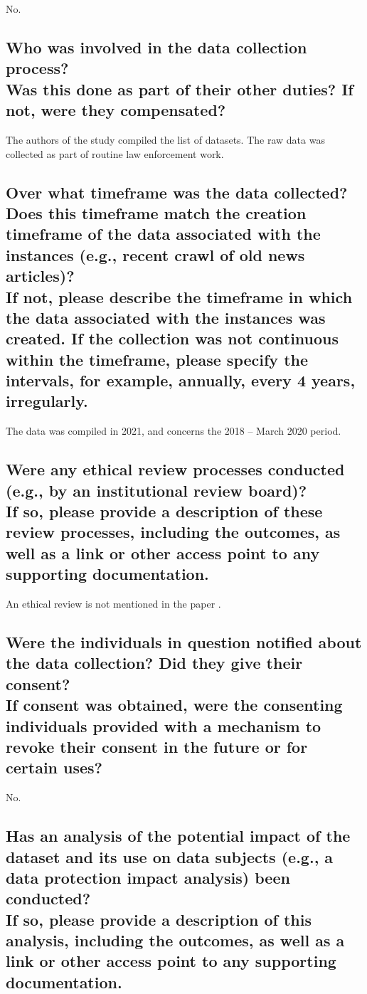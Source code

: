 \documentclass[letterpaper, 10 pt, conference]{ieeeconf}  %
\newcommand{\subtitle}[1]{{\\ \small \normalfont \color{purple} #1}}
\begin{document}
No.

\subsection{Who was involved in the data collection process? \subtitle{Was this done as part of their other duties? If not, were they compensated?}}
 
The authors of the study \cite{zhou2021empirical} compiled the list of datasets. The raw data was collected as part of routine law enforcement work. 

\subsection{Over what timeframe was the data collected? Does this timeframe match the creation timeframe of the data associated with the instances (e.g., recent crawl of old news articles)? \subtitle{If not, please describe the timeframe in which the data associated with the instances was created. If the collection was not continuous within the timeframe, please specify the intervals, for example, annually, every 4 years, irregularly.}}

The data was compiled in 2021, and concerns the 2018 -- March 2020 period.

\subsection{Were any ethical review processes conducted (e.g., by an institutional review board)? \subtitle{If so, please provide a description of these review processes, including the outcomes, as well as a link or other access point to any supporting documentation.}}

An ethical review is not mentioned in the paper \cite{zhou2021empirical}. 

\subsection{Were the individuals in question notified about the data collection? Did they give their consent? \subtitle{If consent was obtained, were the consenting individuals provided with a mechanism to revoke their consent in the future or for certain uses?}}

No. 

\subsection{Has an analysis of the potential impact of the dataset and its use on data subjects (e.g., a data protection impact analysis) been conducted? \subtitle{If so, please provide a description of this analysis, including the outcomes, as well as a link or other access point to any supporting documentation.}}
\end{document}
